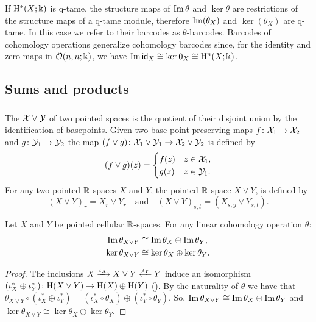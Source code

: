 If $\mathrm{H}^*(X;\Bbbk)$ is q-tame, the structure maps of $\operatorname{Im}\theta$ and $\ker\theta$ are restrictions of the structure maps of a q-tame module, therefore $\operatorname{Im}(\theta_X)$ and $\ker(\theta_X)$ are q-tame.
In this case we refer to their barcodes as $\theta$-barcodes.
Barcodes of cohomology operations generalize cohomology barcodes since, for the identity and zero maps in $\mathcal{O}(n,n;\Bbbk)$, we have $\operatorname{Im}\mathsf{id}_X \cong \ker0_X \cong \mathrm{H}^n(X;\Bbbk)$.



\subsection{Sums and products}

\subsubsection{}
The  $\mathcal{X} \vee \mathcal{Y}$ of two pointed spaces is the quotient of their disjoint union by the identification of basepoints.
Given two base point preserving maps $f \colon \mathcal{X}_1 \to \mathcal{X}_2$ and $g \colon \mathcal{Y}_1 \to \mathcal{Y}_2$ the map $(f \vee g) \colon \mathcal{X}_1 \vee \mathcal{Y}_1 \to \mathcal{X}_2 \vee \mathcal{Y}_2$ is defined by
\[
(f \vee g)(z) =
\begin{cases}
	f(z) & z \in \mathcal{X}_1, \\
	g(z) & z \in \mathcal{Y}_1.\\
\end{cases}
\]
For any two pointed $\mathbb{R}$-spaces $X$ and $Y$, the pointed $\mathbb{R}$-space $X \vee Y$, is defined by
\[
(X \vee Y)_r = X_r \vee Y_r \quad\text{and}\quad (X \vee Y)_{s,t} = (X_{s,y} \vee Y_{s,t}).
\]

\medskip\theorem
Let $X$ and $Y$ be pointed cellular $\mathbb{R}$-spaces.
For any linear cohomology operation $\theta$:
\begin{align*}
	\operatorname{Im}\theta_{X \vee Y} &\cong \operatorname{Im}\theta_X \oplus \operatorname{Im}\theta_Y, \\
	\ker\theta_{X \vee Y} &\cong \ker\theta_X \oplus \ker\theta_Y.
\end{align*}

\begin{proof}
	The inclusions $X \xrightarrow{\iota_X} X \vee Y \xleftarrow{\iota_Y} Y$ induce an isomorphism $(\iota^*_X \oplus \iota^*_Y) \colon \mathrm{H}(X \vee Y) \to \mathrm{H}(X) \oplus \mathrm{H}(Y)$ (\cite[Corollary 2.25.]{hatcher2000}).
	By the naturality of $\theta$ we have that $\theta_{X \vee Y} \circ (\iota^*_X \oplus \iota^*_Y) = (\iota^*_X \circ \theta_X) \oplus (\iota^*_Y \circ \theta_Y)$.
	So, $\operatorname{Im}\theta_{X \vee Y} \cong \operatorname{Im}\theta_X \oplus \operatorname{Im}\theta_Y$ and $\ker\theta_{X \vee Y} \cong \ker\theta_X \oplus \ker\theta_Y$.
\end{proof}

